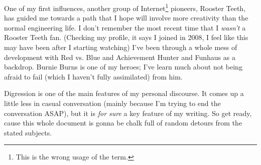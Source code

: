 \documentclass[../philo.tex]{subfiles}
\begin{document}
One of my first influences, another group of Internet\footnote[1]{This is the wrong usage of the term.} pioneers, Rooster Teeth, has guided me towards a path that I hope will involve more creativity than the normal engineering life.
I don't remember the most recent time that I \emph{wasn't} a Rooster Teeth fan.
(Checking my profile, it says I joined in 2008, I feel like this may have been after I starting watching)
I've been through a whole mess of development with Red vs. Blue and Achievement Hunter and Funhaus as a backdrop.
Burnie Burns is one of my heroes; I've learn much about not being afraid to fail (which I haven't fully assimilated) from him.

Digression is one of the main features of my personal discourse.
It comes up a little less in casual conversation (mainly because I'm trying to end the conversation ASAP), but it is \emph{for sure} a key feature of my writing.
So get ready, cause this whole document is gonna be chalk full of random detours from the stated subjects.
\end{document}
